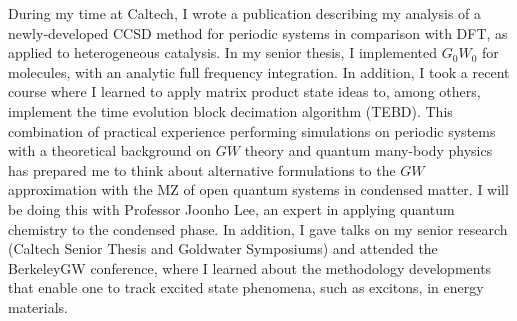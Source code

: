 During my time at Caltech, I wrote a publication describing my analysis of a newly-developed CCSD method for periodic systems in comparison with DFT, as applied to heterogeneous catalysis. In my senior thesis, I implemented $G_0W_0$ for molecules, with an analytic full frequency integration. In addition, I took a recent course where I learned to apply matrix product state ideas to, among others, implement the time evolution block decimation algorithm (TEBD). This combination of practical experience performing simulations on periodic systems with a theoretical background on $GW$ theory and quantum many-body physics has prepared me to think about alternative formulations to the $GW$ approximation with the MZ of open quantum systems in condensed matter. I will be doing this with Professor Joonho Lee, an expert in applying quantum chemistry to the condensed phase. In addition, I gave talks on my senior research (Caltech Senior Thesis and Goldwater Symposiums) and attended the BerkeleyGW conference, where I learned about the methodology developments that enable one to track excited state phenomena, such as excitons, in energy materials.